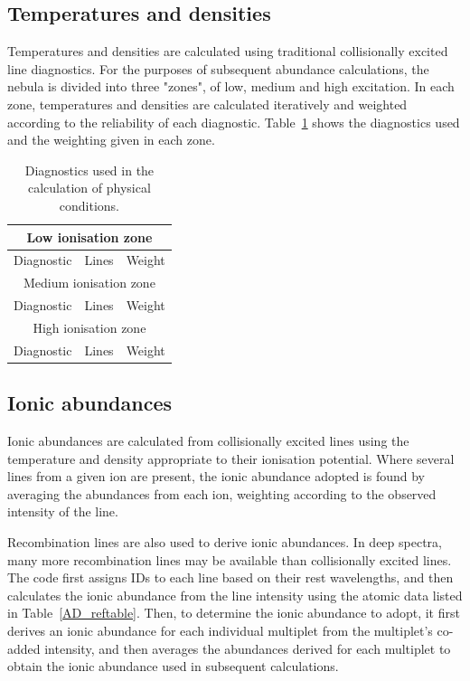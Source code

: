 \documentclass[useAMS,usenatbib]{mn2e}
\begin{document}
\subsection{Temperatures and densities}

Temperatures and densities are calculated using traditional collisionally excited line diagnostics.  For the purposes of subsequent abundance calculations, the nebula is divided into three "zones", of low, medium and high excitation.  In each zone, temperatures and densities are calculated iteratively and weighted according to the reliability of each diagnostic.  Table~\ref{zonestable} shows the diagnostics used and the weighting given in each zone.

\begin{table}
\begin{tabular}{ccc}
\hline
\multicolumn{3}{c}{Low ionisation zone}\\
\hline
Diagnostic & Lines & Weight \\
\hline
\multicolumn{3}{c}{Medium ionisation zone}\\
\hline
Diagnostic & Lines & Weight \\
\hline
\multicolumn{3}{c}{High ionisation zone}\\
\hline
Diagnostic & Lines & Weight \\
\end{tabular}
\label{zonestable}
\caption{Diagnostics used in the calculation of physical conditions.}
\end{table}

\subsection{Ionic abundances}

Ionic abundances are calculated from collisionally excited lines using the temperature and density appropriate to their ionisation potential.  Where several lines from a given ion are present, the ionic abundance adopted is found by averaging the abundances from each ion, weighting according to the observed intensity of the line.

Recombination lines are also used to derive ionic abundances.  In deep spectra, many more recombination lines may be available than collisionally excited lines.  The code first assigns IDs to each line based on their rest wavelengths, and then calculates the ionic abundance from the line intensity using the atomic data listed in Table~\ref{AD_reftable}.  Then, to determine the ionic abundance to adopt, it first derives an ionic abundance for each individual multiplet from the multiplet's co-added intensity, and then averages the abundances derived for each multiplet to obtain the ionic abundance used in subsequent calculations.
\end{document}
